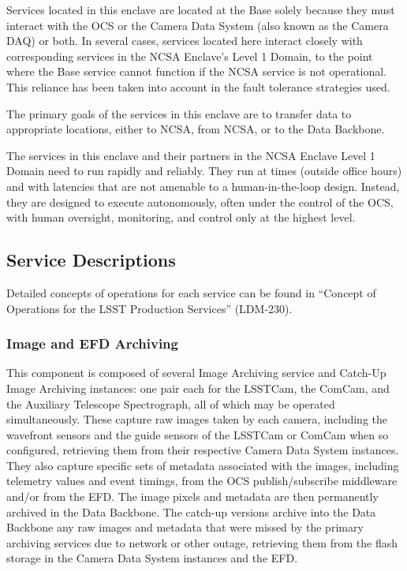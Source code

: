 \documentclass[]{article}
\begin{document}
Services located in this enclave are located at the Base solely because
they must interact with the OCS or the Camera Data System (also known as
the Camera DAQ) or both. In several cases, services located here
interact closely with corresponding services in the NCSA Enclave's Level
1 Domain, to the point where the Base service cannot function if the
NCSA service is not operational. This reliance has been taken into
account in the fault tolerance strategies used.

The primary goals of the services in this enclave are to transfer data
to appropriate locations, either to NCSA, from NCSA, or to the Data
Backbone.

The services in this enclave and their partners in the NCSA Enclave
Level 1 Domain need to run rapidly and reliably. They run at times
(outside office hours) and with latencies that are not amenable to a
human-in-the-loop design. Instead, they are designed to execute
autonomously, often under the control of the OCS, with human oversight,
monitoring, and control only at the highest level.

\subsection{Service Descriptions}\label{service-descriptions}

Detailed concepts of operations for each service can be found in
``Concept of Operations for the LSST Production Services'' (LDM-230).

\subsubsection{Image and EFD Archiving}\label{image-and-efd-archiving}

This component is composed of several Image Archiving service and
Catch-Up Image Archiving instances: one pair each for the LSSTCam, the
ComCam, and the Auxiliary Telescope Spectrograph, all of which may be
operated simultaneously. These capture raw images taken by each camera,
including the wavefront sensors and the guide sensors of the LSSTCam or
ComCam when so configured, retrieving them from their respective Camera
Data System instances. They also capture specific sets of metadata
associated with the images, including telemetry values and event
timings, from the OCS publish/subscribe middleware and/or from the EFD.
The image pixels and metadata are then permanently archived in the Data
Backbone. The catch-up versions archive into the Data Backbone any raw
images and metadata that were missed by the primary archiving services
due to network or other outage, retrieving them from the flash storage
in the Camera Data System instances and the EFD.
\end{document}
